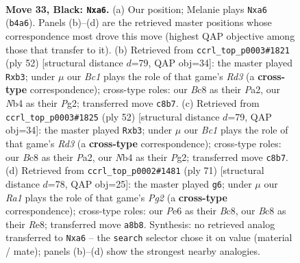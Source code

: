 \documentclass[11pt]{article}
\begin{document}
\clearpage

\begin{figure}[p]\centering
\begin{subfigure}{0.46\textwidth}\centering
\resizebox{\linewidth}{!}{%
\newchessgame
\chessboard[
  setfen={r1b2bn1/pNp1k3/P1p1p3/8/1n3P2/8/3R4/RNB1K3 b Q - 2 33},
  showmover=false,
  pgfstyle=straightmove, color=movearrow, markmove={b4-a6}
]}
\caption{}
\end{subfigure}\hfill
\begin{subfigure}{0.46\textwidth}\centering
\resizebox{\linewidth}{!}{%
\newchessgame
\chessboard[
  setfen={2r4r/2N1Pk1p/pp1B2p1/8/6b1/1n1R4/P5PP/6K1 w - - 2 27},
  showmover=false,
  pgfstyle=straightmove, color=movearrow, markmove={d3-b3}
]}
\caption{}
\end{subfigure}
\\[4pt]
\begin{subfigure}{0.46\textwidth}\centering
\resizebox{\linewidth}{!}{%
\newchessgame
\chessboard[
  setfen={2r4r/2N1Pk1p/pp1B2p1/8/6b1/1n1R4/P5PP/6K1 w - - 2 27},
  showmover=false,
  pgfstyle=straightmove, color=movearrow, markmove={d3-b3}
]}
\caption{}
\end{subfigure}\hfill
\begin{subfigure}{0.46\textwidth}\centering
\resizebox{\linewidth}{!}{%
\newchessgame
\chessboard[
  setfen={2b1r2k/1p4pp/1n3b2/r3Np2/5P2/1B4P1/4NK1P/1R1R4 b - - 3 36},
  showmover=false,
  pgfstyle=straightmove, color=movearrow, markmove={g7-g6}
]}
\caption{}
\end{subfigure}
\caption{\textbf{Move 33, Black: \texttt{Nxa6}.} (a) Our position; Melanie plays \texttt{Nxa6} (\texttt{b4a6}). Panels (b)--(d) are the retrieved master positions whose correspondence most drove this move (highest QAP objective among those that transfer to it). (b) Retrieved from \texttt{ccrl\_top\_p0003\#1821} (ply 52) [structural distance $d$=79, QAP obj=34]: the master played \texttt{Rxb3}; under $\mu$ our \emph{Bc1} plays the role of that game's \emph{Rd3} (a \textbf{cross-type} correspondence); cross-type roles: our \emph{B}c8 as their \emph{P}a2, our \emph{N}b4 as their \emph{P}g2; transferred move \texttt{c8b7}. (c) Retrieved from \texttt{ccrl\_top\_p0003\#1825} (ply 52) [structural distance $d$=79, QAP obj=34]: the master played \texttt{Rxb3}; under $\mu$ our \emph{Bc1} plays the role of that game's \emph{Rd3} (a \textbf{cross-type} correspondence); cross-type roles: our \emph{B}c8 as their \emph{P}a2, our \emph{N}b4 as their \emph{P}g2; transferred move \texttt{c8b7}. (d) Retrieved from \texttt{ccrl\_top\_p0002\#1481} (ply 71) [structural distance $d$=78, QAP obj=25]: the master played \texttt{g6}; under $\mu$ our \emph{Ra1} plays the role of that game's \emph{Pg2} (a \textbf{cross-type} correspondence); cross-type roles: our \emph{P}e6 as their \emph{B}c8, our \emph{B}c8 as their \emph{R}e8; transferred move \texttt{a8b8}. Synthesis: no retrieved analog transferred to \texttt{Nxa6} -- the \texttt{search} selector chose it on value (material / mate); panels (b)--(d) show the strongest nearby analogies.}
\label{fig:thought-m65}
\end{figure}
\end{document}
